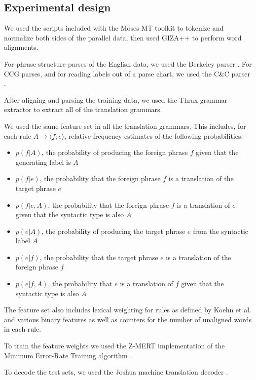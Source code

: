 \documentclass{article}
\begin{document}
\subsection{Experimental design}

We used the scripts included with the Moses MT toolkit \cite{moses} to tokenize and normalize both sides of the parallel data, then used GIZA++ \cite{giza} to perform word alignments.

For phrase structure parses of the English data, we used the Berkeley parser \cite{berkeley}. For CCG parses, and for reading labels out of a parse chart, we used the C\&C parser \cite{candc}.

After aligning and parsing the training data, we used the Thrax grammar extractor \cite{joshua3} to extract all of the translation grammars.

We used the same feature set in all the translation grammars. This includes, for each rule $A \to \langle f ; e \rangle$, relative-frequency estimates of the following probabilities:
\begin{itemize}
\item $p(f|A)$, the probability of producing the foreign phrase $f$ given that the generating label is $A$
\item $p(f|e)$, the probability that the foreign phrase $f$ is a translation of the target phrase $e$
\item $p(f|e,A)$, the probability that the foreign phrase $f$ is a translation of $e$ given that the syntactic type is also $A$
\item $p(e|A)$, the probability of producing the target phrase $e$ from the syntactic label $A$
\item $p(e|f)$, the probability that the target phrase $e$ is a translation of the foreign phrase $f$
\item $p(e|f,A)$, the probability that $e$ is a translation of $f$ given that the syntactic type is also $A$
\end{itemize}
The feature set also includes lexical weighting for rules as defined by Koehn et al.  and various binary features as well as counters for the number of unaligned words in each rule.

To train the feature weights we used the Z-MERT implementation \cite{zmert} of the Minimum Error-Rate Training algorithm \cite{mert}.

To decode the test sets, we used the Joshua machine translation decoder \cite{joshua3}.
\end{document}

